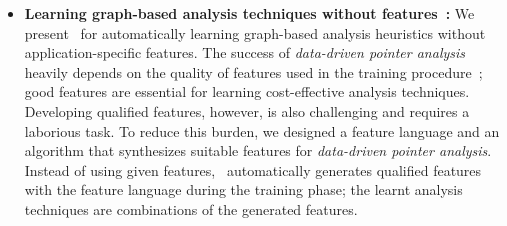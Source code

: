 \begin{itemize}
\item {\bf Learning graph-based analysis techniques without features~\cite{Graphick20}:}
We present \ourtool~for automatically learning graph-based analysis heuristics without application-specific features.
The success of {\em data-driven pointer analysis} heavily depends on the quality of features used in the training procedure~\cite{JeJeChOh17,ChOhHeYa17}; good features are essential for learning cost-effective analysis techniques.
Developing qualified features, however, is also challenging and requires a laborious task.
To reduce this burden, we designed a feature language and an algorithm that synthesizes suitable features for {\em data-driven pointer analysis}.
Instead of using given features, \ourtool~automatically generates qualified features with the feature language during the training phase; the learnt analysis techniques are combinations of the generated features. 



\end{itemize}


